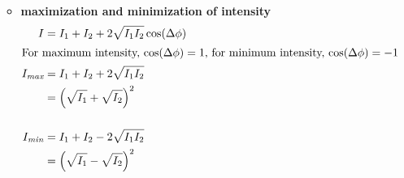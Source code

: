 \begin{itemize}
\begin{itemize}
\begin{align*}
        \end{align*}
        \pagebreak
        \item \textbf{maximization and minimization of intensity}
        \begin{align*}
            I &= I_1 + I_2 + 2\sqrt{I_1I_2}\cos(\Delta \phi)\\
            \intertext{For maximum intensity, $\cos(\Delta \phi) = 1$, for minimum intensity, $\cos(\Delta \phi) = -1$}
            I_{\textit{max}} &= I_1 + I_2 + 2\sqrt{I_1I_2}\\
                            &= \left(\sqrt{I_1} + \sqrt{I_2}\right)^2\\[5mm]
            I_{\textit{min}} &= I_1 + I_2 - 2\sqrt{I_1I_2}\\
                            &= \left(\sqrt{I_1} - \sqrt{I_2}\right)^2\\
        \end{align*}
    \end{itemize}

\end{itemize}

